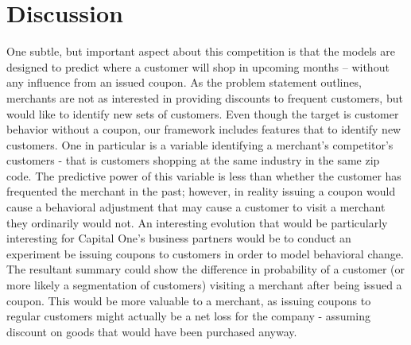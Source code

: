 \documentclass[12pt]{article} %
\begin{document}
\section{Discussion}
One subtle, but important aspect about this competition is that the models are designed to predict where a customer will shop in upcoming months -- without any influence from an issued coupon.  As the problem statement outlines, merchants are not as interested in providing discounts to frequent customers, but would like to identify new sets of customers.  Even though the target is customer behavior without a coupon, our framework includes features that to identify new customers.  One in particular is a variable identifying a merchant's competitor's customers - that is customers shopping at the same industry in the same zip code.  The predictive power of this variable is less than whether the customer has frequented the merchant in the past; however, in reality issuing a coupon would cause a behavioral adjustment that may cause a customer to visit a merchant they ordinarily would not.  An interesting evolution that would be particularly interesting for Capital One's business partners would be to conduct an experiment be issuing coupons to customers in order to model behavioral change.  The resultant summary could show the difference in probability of a customer (or more likely a segmentation of customers)  visiting a merchant after being issued a coupon.  This would be more valuable to a merchant, as issuing coupons to regular customers might actually be a net loss for the company - assuming discount on goods that would have been purchased anyway.  
\end{document}
